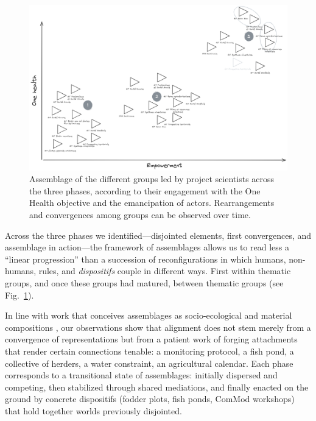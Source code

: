 \documentclass{article}
\begin{document}
\begin{figure}
    \centering
    \includegraphics[width=1\linewidth]{img/Drawing 2025-09-07 11.03.30.excalidraw.png}
    \caption{Assemblage of the different groups led by project scientists across the three phases, according to their engagement with the One Health objective and the emancipation of actors. Rearrangements and convergences among groups can be observed over time.}
    \label{fig:alignement-proj}
\end{figure}

Across the three phases we identified—disjointed elements, first convergences, and assemblage in action—the framework of assemblages allows us to read less a “linear progression” than a succession of reconfigurations in which humans, non-humans, rules, and \textit{dispositifs} couple in different ways. First within thematic groups, and once these groups had matured, between thematic groups (see Fig.~\ref{fig:alignement-proj}).  

In line with work that conceives assemblages as socio-ecological and material compositions \parencite{hertz_knowledge_2025}, our observations show that alignment does not stem merely from a convergence of representations but from a patient work of forging attachments that render certain connections tenable: a monitoring protocol, a fish pond, a collective of herders, a water constraint, an agricultural calendar. Each phase corresponds to a transitional state of assemblages: initially dispersed and competing, then stabilized through shared mediations, and finally enacted on the ground by concrete dispositifs (fodder plots, fish ponds, ComMod workshops) that hold together worlds previously disjointed.  
\end{document}
